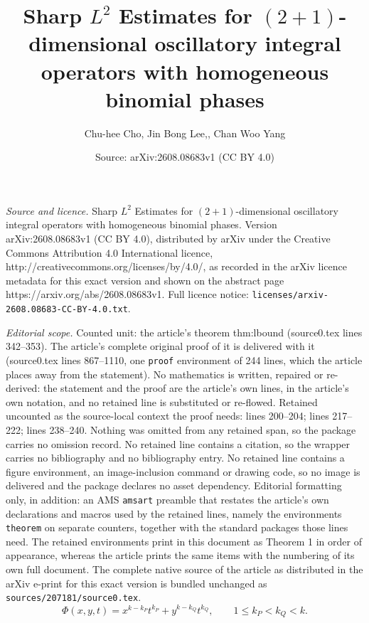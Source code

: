 \documentclass[10pt,a4paper]{amsart}
\title{Sharp $L^2$ Estimates for $(2+1)$-dimensional oscillatory integral operators with homogeneous binomial phases}
\author{Chu-hee Cho, Jin Bong Lee,, Chan Woo Yang}
\date{Source: arXiv:2608.08683v1 (CC BY 4.0)}
\begin{document}
\maketitle

\noindent\emph{Source and licence.} Sharp $L^2$ Estimates for $(2+1)$-dimensional oscillatory integral operators with homogeneous binomial phases. Version arXiv:2608.08683v1 (CC BY 4.0), distributed by arXiv under the Creative Commons Attribution 4.0 International licence, http://creativecommons.org/licenses/by/4.0/, as recorded in the arXiv licence metadata for this exact version and shown on the abstract page https://arxiv.org/abs/2608.08683v1. Full licence notice: \texttt{licenses/arxiv-2608.08683-CC-BY-4.0.txt}.\par\smallskip

\noindent\textit{Editorial scope.} Counted unit: the article's theorem thm:lbound (source0.tex lines 342--353). The article's complete original proof of it is delivered with it (source0.tex lines 867--1110, one \texttt{proof} environment of 244 lines, which the article places away from the statement). No mathematics is written, repaired or re-derived: the statement and the proof are the article's own lines, in the article's own notation, and no retained line is substituted or re-flowed.  Retained uncounted as the source-local context the proof needs: lines 200--204; lines 217--222; lines 238--240.  Nothing was omitted from any retained span, so the package carries no omission record.  No retained line contains a citation, so the wrapper carries no bibliography and no bibliography entry.  No retained line contains a figure environment, an image-inclusion command or drawing code, so no image is delivered and the package declares no asset dependency.  Editorial formatting only, in addition: an AMS \texttt{amsart} preamble that restates the article's own declarations and macros used by the retained lines, namely the environments \texttt{theorem} on separate counters, together with the standard packages those lines need.  The retained environments print in this document as Theorem 1 in order of appearance, whereas the article prints the same items with the numbering of its own full document.  The complete native source of the article as distributed in the arXiv e-print for this exact version is bundled unchanged as \texttt{sources/207181/source0.tex}.
    \begin{equation}\label{eq:intro_phase}
    \Phi(x,y,t)=x^{k-k_P}t^{k_P}+y^{k-k_Q}t^{k_Q},
    \qquad
    1\le k_P<k_Q<k.
    \end{equation}
\end{document}
